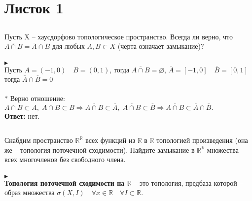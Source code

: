 \newpage
	\section{Листок 1}
		\subsection{}
		Пусть X -- хаусдорфово топологическое пространство. Всегда ли верно, что $\overline{A \cap B} = \overline{A} \cap \overline{B}$ для любых $A, B \subset X$ (черта означает замыкание)?\\
		\\
		$\blacktriangleright$\\
		Пусть $A = (-1, 0)\quad B = (0, 1)$, тогда $\overline{A \cap B} = \varnothing$, $\overline{A} = [-1, 0]\quad \overline{B} = [0, 1]$ тогда $\overline{A} \cap \overline{B} = 0$\\
		\\
		$*$ Верно отношение: $A \cap B \subset A, \; A \cap B \subset B \Rightarrow \overline{A \cap B} \subset \overline{A}, \; \overline{A \cap B} \subset \overline{B} \Rightarrow \overline{A \cap B} \subset \overline{A} \cap \overline{B}.$\\
		\textbf{Ответ:} нет.\\
		\begin{comment}
			Определим топологию на $\mathbb{R}^{1}$, порожденную стандартной Евклидовой метрикой.\\
			$A = (-\infty, 0), \; B = (0, +\infty) \Rightarrow \overline{A \cap B} = \varnothing, \; \overline{A} \cap \overline{B} = \{0\} \neq \varnothing \Rightarrow$ не всегда верно равенство.\\
		\end{comment}
	
	
		\subsection{}
		Снабдим пространство $\mathbb{R}^{\mathbb{R}}$ всех функций из $\mathbb{R}$ в $\mathbb{R}$ топологией произведения (она же -- топология поточечной сходимости). Найдите замыкание в $\mathbb{R}^{\mathbb{R}}$ множества всех многочленов без свободного члена.\\
		\\		
		$\blacktriangleright$\\
		\textbf{Топология поточечной сходимости на $\mathbb{R}$} -- это топология, предбаза которой -- образ множества $\sigma(X, I) \quad \forall x \in \mathbb{R} \quad \forall I \subset \mathbb{R}.$\\
		
